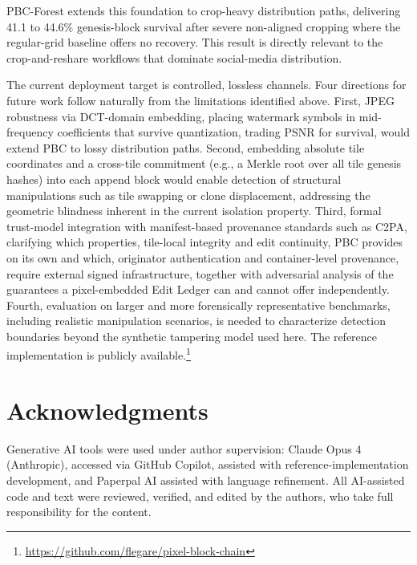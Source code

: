 \documentclass[conference]{IEEEtran}
\begin{document}
PBC-Forest extends this foundation to crop-heavy distribution paths,
delivering 41.1 to 44.6\% genesis-block survival after severe
non-aligned cropping where the regular-grid baseline offers no
recovery. This result is directly relevant to the crop-and-reshare
workflows that dominate social-media distribution.

The current deployment target is controlled, lossless channels. Four
directions for future work follow naturally from the limitations
identified above. First, JPEG robustness via DCT-domain embedding, placing watermark symbols
in mid-frequency coefficients that survive quantization, trading PSNR for survival, would extend
PBC to lossy distribution paths. Second, embedding absolute tile coordinates and a cross-tile commitment (e.g., a Merkle root over all tile genesis hashes) into
each append block would enable detection of structural manipulations
such as tile swapping or clone displacement, addressing the geometric
blindness inherent in the current isolation property. Third, formal trust-model integration with manifest-based provenance standards such as C2PA, clarifying which properties, tile-local integrity and edit continuity, PBC provides on its own and which, originator authentication and container-level provenance, require external signed infrastructure, together with adversarial analysis of the guarantees a pixel-embedded Edit Ledger can and cannot offer independently. Fourth, evaluation on
larger and more forensically representative benchmarks, including
realistic manipulation scenarios, is needed to characterize detection
boundaries beyond the synthetic tampering model used here. The
reference implementation is publicly
available.\footnote{\url{https://github.com/flegare/pixel-block-chain}}


\section*{Acknowledgments}

Generative AI tools were used under author supervision: Claude Opus 4 (Anthropic), accessed via GitHub Copilot, assisted with reference-implementation development, and Paperpal AI assisted with language refinement. All AI-assisted code and text were reviewed, verified, and edited by the authors, who take full responsibility for the content.


\end{document}
